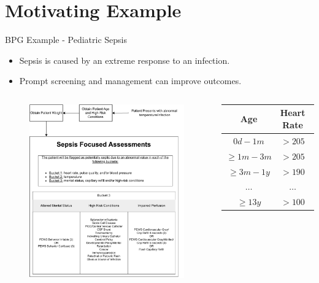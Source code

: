 \documentclass{beamer}
\begin{document}
\section{Motivating Example}
\begin{frame}{BPG Example - Pediatric Sepsis}
  \begin{itemize}
    \item Sepsis is caused by an extreme response to an infection.
    \item Prompt screening and management can improve outcomes.
  \end{itemize}
  \pause
  \begin{columns}
    \begin{figure}
      \includegraphics[width=\textwidth]{sepsis-screening-osf}
    \end{figure}
    \tiny
    \begin{tabular}{ | c || c | c | }
      \hline
      \textbf{Age}            & \textbf{Heart Rate}    & \textbf{Temp}  \\
      \hline
      $0d - 1m$               & $>205$                 & $<36 \text{ or } >38$ \\
      \hline
      $\geq 1m - 3m$          & $>205$                 & $<36 \text{ or } >38$ \\
      \hline
      $\geq 3m - 1y$          & $>190$                 & $<36 \text{ or } >38.5$ \\
      \hline
      $\dots$                 & $\dots$                & $\dots$ \\
      \hline
      $\geq 13y$              & $>100$                 & $<36 \text{ or } >38.5$ \\
      \hline
    \end{tabular}
  \end{columns}
\end{frame}
\end{document}
